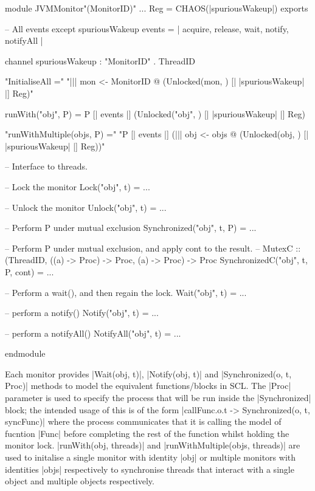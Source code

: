 \begin{cspm}[caption={The interface of the JVMMonitor module; changes are underlined}, label={listing::JVMMonitorInterface}]
module JVMMonitor"(MonitorID)"
    ...
    Reg = CHAOS({|spuriousWakeup|})
exports

    -- All events except spuriousWakeup
    events = {| acquire, release, wait, notify, notifyAll |}

    channel spuriousWakeup : "MonitorID" . ThreadID
  
    "InitialiseAll ="
      "||| mon <- MonitorID @ (Unlocked(mon, {})  [| {|spuriousWakeup|} |] Reg)"

    runWith("obj", P) = P [| events |] (Unlocked("obj", {})  [| {|spuriousWakeup|} |] Reg)

    "runWithMultiple(objs, P) ="
    "P [| events |] (||| obj <- objs @ (Unlocked(obj, {})  [| {|spuriousWakeup|} |] Reg))"

    -- Interface to threads.

    -- Lock the monitor
    Lock("obj", t) = ...

    -- Unlock the monitor
    Unlock("obj", t) = ...

    -- Perform P under mutual exclusion
    Synchronized("obj", t, P) = ...

    -- Perform P under mutual exclusion, and apply cont to the result. 
    -- MutexC :: (ThreadID, ((a) -> Proc) -> Proc, (a) -> Proc) -> Proc
    SynchronizedC("obj", t, P, cont) = ...

    -- Perform a wait(), and then regain the lock.
    Wait("obj", t) = ... 

    -- perform a notify()
    Notify("obj", t) = ...

    -- perform a notifyAll()
    NotifyAll("obj", t) = ...

endmodule
\end{cspm}



Each monitor provides |Wait(obj, t)|, |Notify(obj, t)| and |Synchronized(o, t, Proc)| methods to model the equivalent functions/blocks in SCL. The |Proc| parameter is used to specify the process that will be run inside the |Synchronized| block; the intended usage of this is of the form |callFunc.o.t -> Synchronized(o, t, syncFunc)| where the process communicates that it is calling the model of fucntion |Func| before completing the rest of the function whilst holding the monitor lock. |runWith(obj, threads)| and |runWithMultiple(objs, threads)| are used to initalise a single monitor with identity |obj| or multiple monitors with identities |objs| respectively to synchronise threads that interact with a single object and multiple objects respectively.


% 

